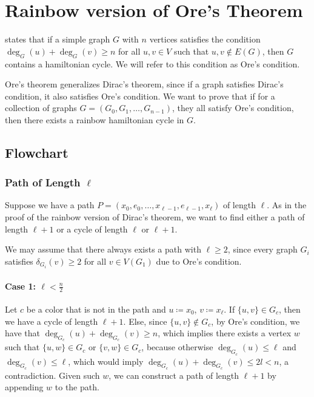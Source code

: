 
\chapter{Rainbow version of Ore's Theorem}

\cite{Ore_1960} states that if a simple graph $G$ with $n$ vertices satisfies the condition
$\deg_G(u) + \deg_G(v) \geq n$ for all $u, v \in V$ such that ${u, v} \not\in E(G)$, then $G$ contains a hamiltonian cycle.
We will refer to this condition as Ore's condition.

Ore's theorem generalizes Dirac's theorem, since if a graph satisfies Dirac's condition, it also satisfies Ore's condition.
We want to prove that if for a collection of graphs $G = (G_0, G_1, \ldots, G_{n-1})$, they all satisfy Ore's condition,
then there exists a rainbow hamiltonian cycle in $G$.

\section{Flowchart}

\subsection{Path of Length $\ell$}

Suppose we have a path $ P = (x_0, e_0, \dots, x_{\ell-1}, e_{\ell-1}, x_{\ell}) $ of length $ \ell $.
As in the proof of the rainbow version of Dirac's theorem,
we want to find either a path of length $ \ell+1 $ or a cycle of length $ \ell $ or $ \ell+1 $.

We may assume that there always exists a path with $ \ell \geq 2 $, since every graph 
$ G_i $ satisfies $ \delta_{G_i}(v) \geq 2 $ for all $ v \in V(G_1) $ due to Ore's condition.

\subsubsection{Case 1: \( \ell < \frac{n}{2} \)}

Let \( c \) be a color that is not in the path and \(u \coloneqq x_0\), \(v \coloneqq x_{\ell}\). 
If \( \{u, v\} \in G_c \), then we have a cycle of length \( \ell+1 \).
Else, since \( \{u, v\} \not\in G_c \), by Ore's condition, 
we have that \( \deg_{G_c}(u) + \deg_{G_c}(v) \geq n \), which implies there exists a 
vertex \( w \) such that \( \{u, w\} \in G_c \) or \( \{v, w\} \in G_c \), because otherwise
\( \deg_{G_c}(u) \leq \ell  \) and \( \deg_{G_c}(v) \leq \ell \), 
which would imply \( \deg_{G_c}(u) + \deg_{G_c}(v) \leq 2l < n \), a contradiction.
Given such \(w\), we can construct a path of length \( \ell+1 \) by appending \(w\) to the path.

